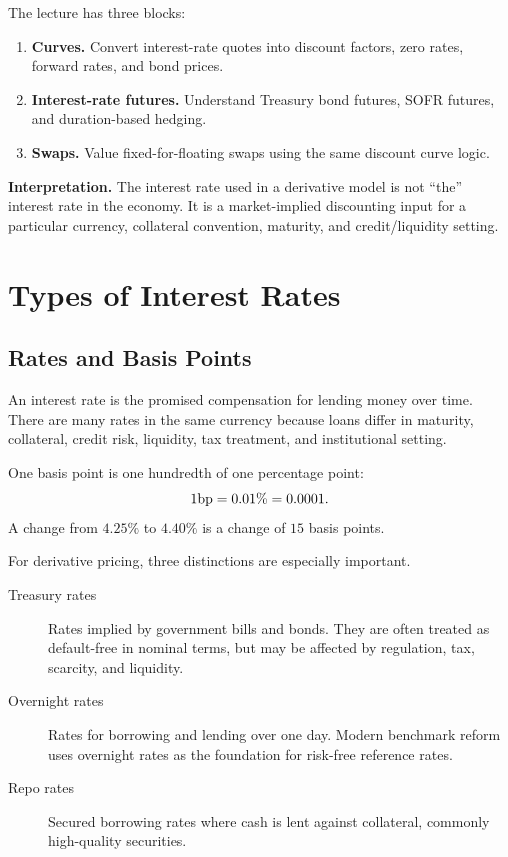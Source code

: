 The lecture has three blocks:
\begin{enumerate}
    \item \textbf{Curves.} Convert interest-rate quotes into discount factors,
    zero rates, forward rates, and bond prices.
    \item \textbf{Interest-rate futures.} Understand Treasury bond futures,
    SOFR futures, and duration-based hedging.
    \item \textbf{Swaps.} Value fixed-for-floating swaps using the same
    discount curve logic.
\end{enumerate}

\begin{boxF}
\textbf{Interpretation.} The interest rate used in a derivative model is not
``the'' interest rate in the economy. It is a market-implied discounting input
for a particular currency, collateral convention, maturity, and credit/liquidity
setting.
\end{boxF}

\section{Types of Interest Rates}

\subsection{Rates and Basis Points}

An interest rate is the promised compensation for lending money over time.
There are many rates in the same currency because loans differ in maturity,
collateral, credit risk, liquidity, tax treatment, and institutional setting.

\begin{defN}
One basis point is one hundredth of one percentage point:
\[
    1\mathrm{bp} = 0.01\% = 0.0001.
\]
A change from $4.25\%$ to $4.40\%$ is a change of $15$ basis points.
\end{defN}

For derivative pricing, three distinctions are especially important.
\begin{description}
    \item[Treasury rates] Rates implied by government bills and bonds. They are
    often treated as default-free in nominal terms, but may be affected by
    regulation, tax, scarcity, and liquidity.
    \item[Overnight rates] Rates for borrowing and lending over one day. Modern
    benchmark reform uses overnight rates as the foundation for risk-free
    reference rates.
    \item[Repo rates] Secured borrowing rates where cash is lent against
    collateral, commonly high-quality securities.
\end{description}

